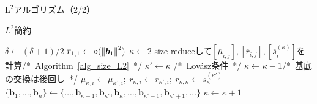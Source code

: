 \documentclass[12pt,aspectratio=169,table,dvipdfmx, leqno]{beamer}
\renewcommand{\Comment}[1]{\quad/*~#1~*/}
\begin{document}
\begin{frame}{$\text{L}^2$アルゴリズム（2/2）}
\begin{algorithm}[H]
    \footnotesize
    \begin{algorithmic}[1]
        \caption{\footnotesize $L^2$簡約\cite{NS05}\cite{NS09}}
        \label{alg_L2}
        \State $\overline{\delta}\gets(\delta+1)/2$
        \State $\overline{r}_{1,1}\gets\diamond(\norm{\bm{b}_1}^2)$
        \State $\kappa\gets 2$
            \State size-reduceして$[\overline{\mu}_{i, j}], [\overline{r}_{i, j}], [\overline{s}_{i}^{(\kappa)}]$を計算\Comment{Algorithm~\ref{alg_size_L2}}
            \State $\kappa'\gets\kappa$
            \Comment{Lov\'asz条件}
                \State $\kappa\gets\kappa-1$\Comment{基底の交換は後回し}
            \EndWhile
                \State $\overline{\mu}_{\kappa, i}\gets\overline{\mu}_{\kappa', i};~\overline{r}_{\kappa, i}\gets\overline{r}_{\kappa', i};~\overline{r}_{\kappa, \kappa}\gets\overline{s}_{\kappa}^{(\kappa')}$
            \EndFor
            \State $\{\bm{b}_1,\ldots,\bm{b}_n\}\gets\{\ldots,\bm{b}_{\kappa-1}, \bm{b}_{\kappa'}, \bm{b}_{\kappa},\ldots,\bm{b}_{\kappa'-1},\bm{b}_{\kappa'+1},\ldots\}$%
            \State $\kappa\gets \kappa+1$
        \EndWhile
    \end{algorithmic}
\end{algorithm}
\end{frame}
\end{document}
